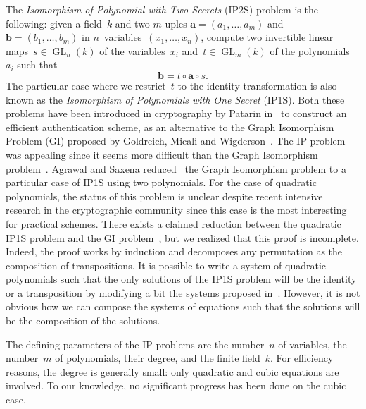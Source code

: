 \documentclass{lms}
\DeclareMathOperator\GL{GL}
\begin{document}
The \emph{Isomorphism of Polynomial with Two Secrets} (IP2S) problem is
the following: given a field~$k$ and two $m$-uples $\bm{a} = (a_1, …,
a_m)$ and~$\bm{b} = (b_1, …, b_m)$ in $n$~variables~$(x_1, …, x_n)$, compute
two invertible linear maps~$s ∈ \GL_n(k)$ of the variables~$x_i$
and~$t ∈ \GL_m(k)$ of the polynomials~$a_i$ such that
\begin{equation*}
\bm{b} = t ∘ \bm{a} ∘ s.
\end{equation*}
The particular case where we restrict~$t$ to the identity transformation
is also known as the \emph{Isomorphism of Polynomials with One Secret}
(IP1S). Both these problems have been introduced in cryptography by
Patarin in~\cite{DBLP:conf/eurocrypt/Patarin96} to construct an efficient
authentication scheme, 
as an alternative to the Graph Isomorphism Problem (GI) proposed by Goldreich, Micali and Wigderson~\cite{DBLP:journals/jacm/GoldreichMW91}.
The IP problem was appealing since 
it seems more difficult than the Graph Isomorphism problem~\cite{DBLP:conf/eurocrypt/PatarinGC98}. 
Agrawal and Saxena reduced~\cite{DBLP:conf/stacs/AgrawalS06} the Graph
Isomorphism problem to a particular case of IP1S using two polynomials.
For the case of quadratic polynomials, the status of this problem is unclear despite recent 
intensive research in the cryptographic community since this case is the most interesting 
for practical schemes. There exists a claimed reduction between the quadratic IP1S problem and the GI
problem~\cite{DBLP:conf/eurocrypt/PatarinGC98}, but we realized that this proof is incomplete. 
Indeed, the proof works by induction and decomposes any permutation as the composition of 
transpositions. It is possible to write a system of quadratic polynomials such that the only solutions 
of the IP1S problem will be the identity or a transposition by modifying a bit the systems proposed 
in~\cite{DBLP:conf/eurocrypt/PatarinGC98}. However, it is not obvious how we can compose the systems 
of equations such that the solutions will be the composition of the solutions. 

\bigbreak

The defining parameters of the IP problems are the number~$n$ of
variables, the number~$m$ of polynomials, their degree, and the finite
field~$k$.
For efficiency reasons, the degree is generally small:
only quadratic and cubic equations are involved.
To our knowledge, no significant progress has been done on the cubic case.
\end{document}
